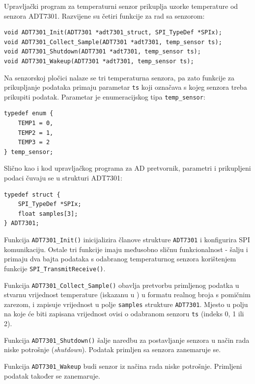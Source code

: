 Upravljački program za temperaturni senzor prikuplja uzorke temperature od senzora ADT7301. Razvijene su četiri funkcije za rad sa senzorom:

\begin{lstlisting}[caption={Funkcije upravljačkog programa za sklop ADT7301}]
void ADT7301_Init(ADT7301 *adt7301_struct, SPI_TypeDef *SPIx);
void ADT7301_Collect_Sample(ADT7301 *adt7301, temp_sensor ts);
void ADT7301_Shutdown(ADT7301 *adt7301, temp_sensor ts);
void ADT7301_Wakeup(ADT7301 *adt7301, temp_sensor ts);
\end{lstlisting}

Na senzorskoj pločici nalaze se tri temperaturna senzora, pa zato funkcije za prikupljanje podataka primaju parametar \texttt{ts} koji označava s kojeg senzora treba prikupiti podatak. Parametar je enumeracijskog tipa \texttt{temp\_sensor}:

\begin{lstlisting}[caption={Definicija tipa \texttt{temp\_sensor}}]
typedef enum {
    TEMP1 = 0,
    TEMP2 = 1,
    TEMP3 = 2
} temp_sensor;
\end{lstlisting}

Slično kao i kod upravljačkog programa za AD pretvornik, parametri i prikupljeni podaci čuvaju se u strukturi ADT7301:

\begin{lstlisting}[caption={Definicija tipa \texttt{ADT7301}}]
typedef struct {
	SPI_TypeDef *SPIx;
	float samples[3];
} ADT7301;
\end{lstlisting}

Funkcija \texttt{ADT7301\_Init()} inicijalizira članove strukture \texttt{ADT7301} i konfigurira SPI komunikaciju. Ostale tri funkcije imaju međusobno sličnu funkcionalnost - šalju i primaju dva bajta podataka s odabranog temperaturnog senzora korištenjem funkcije \texttt{SPI\_TransmitReceive()}. 

Funkcija \texttt{ADT7301\_Collect\_Sample()} obavlja pretvorbu primljenog podatka u stvarnu vrijednost temperature (iskazanu u \textcelsius{}) u formatu realnog broja s pomičnim zarezom, i zapisuje vrijednost u polje \texttt{samples} strukture \texttt{ADT7301}. Mjesto u polju na koje će biti zapisana vrijednost ovisi o odabranom senzoru \texttt{ts} (indeks 0, 1 ili 2).

Funkcija \texttt{ADT7301\_Shutdown()} šalje naredbu za postavljanje senzora u način rada niske potrošnje (\textit{shutdown}). Podatak primljen sa senzora zanemaruje se.

Funkcija \texttt{ADT7301\_Wakeup} \glqq{}budi\grqq{} senzor iz načina rada niske potrošnje. Primljeni podatak također se zanemaruje.

